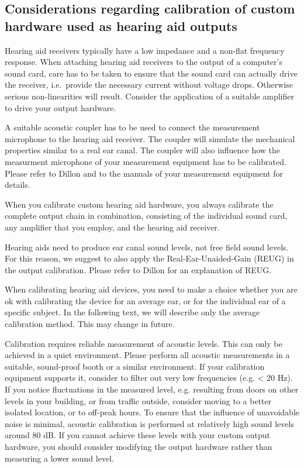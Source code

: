 \documentclass[11pt,a4paper,twoside]{article}
\newcommand{\+}{\discretionary{\mbox{\scriptsize$\hookleftarrow$}}{}{}}
\begin{document}
\subsection{Considerations regarding calibration of custom hardware used as hearing aid outputs}

Hearing aid receivers typically have a low impedance and a non-flat frequency response.
%
When attaching hearing aid receivers to the output of a computer's
sound card, care has to be taken to ensure that the sound card can
actually drive the receiver, i.e.\ provide the necessary current
without voltage drops.
%
Otherwise serious non-linearities will result.
%
Consider the application of a suitable amplifier to drive your output hardware.

A suitable acoustic coupler has to be used to connect the measurement
microphone to the hearing aid receiver.
%
The coupler will simulate the mechanical properties similar to
a real ear canal.
%
The coupler will also influence how the measurment microphone of your
measurement equipment has to be calibrated.
%
Please refer to Dillon and to the manuals of your measurement
equipment for details.

When you calibrate custom hearing aid hardware, you always calibrate
the complete output chain in combination, consisting of
%
the individual sound card, any amplifier that you employ, and the
hearing aid receiver.

Hearing aids need to produce ear canal sound levels, not free field
sound levels.
%
For this reason, we suggest to also apply the Real-Ear-Unaided-Gain
(REUG) in the \mha{} output calibration.
%
Please refer to Dillon for an explanation of REUG.

When calibrating hearing aid devices, you need to make a choice
whether you are ok with calibrating the device for an average ear, or
for the individual ear of a specific subject.
%
In the following text, we will describe only the average calibration
method. This may change in future.

Calibration requires reliable measurement of acoustic levels.
%
This can only be achieved in a quiet environment.
%
Please perform all acoustic measurements in a suitable, sound-proof
booth or a similar environment.
%
If your calibration equipment supports it, consider to filter out very
low frequencies (e.g. < 20 Hz).
%
If you notice fluctuations in the measured level, e.g. resulting from
doors on other levels in your building, or from traffic outside,
consider moving to a better isolated location, or to off-peak hours.
%
To ensure that the influence of unavoidable noise is minimal, acoustic
calibration is performed at relatively high sound levels around 80 dB.
%
If you cannot achieve these levels with your custom output hardware,
you should consider modifying the output hardware rather than
measuring a lower sound level.
\end{document}
